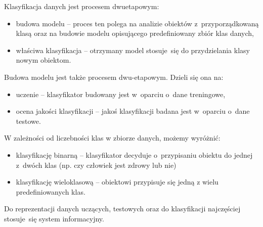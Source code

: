 Klasyfikacja danych jest procesem dwuetapowym:
\begin{itemize}
	\item budowa modelu – proces ten polega na analizie obiektów z przyporządkowaną klasą oraz na budowie modelu opisującego predefiniowany zbiór klas danych,
	\item właściwa klasyfikacja – otrzymany model stosuje się do przydzielania klasy nowym obiektom.
\end{itemize}
Budowa modelu jest także procesem dwu-etapowym. Dzieli się ona na:
\begin{itemize}
	\item uczenie – klasyfikator budowany jest w oparciu o dane treningowe,
	\item ocena jakości klasyfikacji – jakoś klasyfikacji badana jest w oparciu o dane testowe.
\end{itemize}
W zależności od liczebności klas w zbiorze danych, możemy wyróżnić:
\begin{itemize}
	\item klasyfikację binarną – klasyfikator decyduje o przypisaniu obiektu do jednej z dwóch klas (np. czy człowiek jest zdrowy lub nie)
	\item klasyfikację wieloklasową – obiektowi przypisuje się jedną z wielu predefiniowanych klas.
\end{itemize}
Do reprezentacji danych uczących, testowych oraz do klasyfikacji najczęściej stosuje się system informacyjny.
\begin{table}[h]
\begin{center}
	\caption{Przykład danych treningowych składających się z 5 atrybutów oraz klasy decyzyjnej. W ostatniej kolumnie znajduje się wynik klasyfikacji. W pięciu przypadkach, klasyfikator poprawnie wskazał klasę.}
	\label{system_informacyjny}
\end{center}
\end{table}
